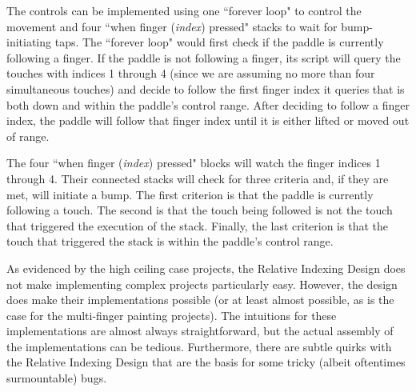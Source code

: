 The controls can be implemented using one ``forever loop" to control the movement and four ``when finger (\emph{index}) pressed" stacks to wait for bump-initiating taps. The ``forever loop" would first check if the paddle is currently following a finger. If the paddle is not following a finger, its script will query the touches with indices 1 through 4 (since we are assuming no more than four simultaneous touches) and decide to follow the first finger index it queries that is both down and within the paddle's control range. After deciding to follow a finger index, the paddle will follow that finger index until it is either lifted or moved out of range. 

The four ``when finger (\emph{index}) pressed" blocks will watch the finger indices 1 through 4. Their connected stacks will check for three criteria and, if they are met, will initiate a bump. The first criterion is that the paddle is currently following a touch. The second is that the touch being followed is not the touch that triggered the execution of the stack. Finally, the last criterion is that the touch that triggered the stack is within the paddle's control range.

As evidenced by the high ceiling case projects, the Relative Indexing Design does not make implementing complex projects particularly easy. However, the design does make their implementations possible (or at least almost possible, as is the case for the multi-finger painting projects). The intuitions for these implementations are almost always straightforward, but the actual assembly of the implementations can be tedious. Furthermore, there are subtle quirks with the Relative Indexing Design that are the basis for some tricky (albeit oftentimes surmountable) bugs.




